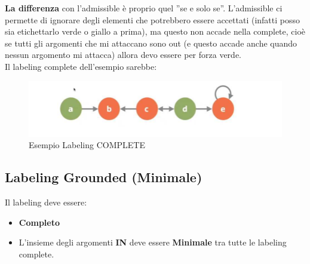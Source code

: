     \noindent \textbf{La differenza} con l'admissible è proprio quel ”se e solo
    se”. L'admissible ci permette di ignorare degli elementi che potrebbero
    essere accettati (infatti posso sia etichettarlo verde o giallo a prima), ma
    questo non accade nella complete, cioè se tutti gli argomenti che mi
    attaccano sono out (e questo accade anche quando nessun argomento mi
    attacca) allora devo essere per forza verde. \\
    Il labeling complete dell'esempio sarebbe:
    \begin{figure}[H]
        \centering
        \includegraphics[width=12cm, keepaspectratio]{img/Cap7/LC2.png}
        \caption{Esempio Labeling COMPLETE}
    \end{figure}

    \subsection{Labeling Grounded (Minimale)}
    Il labeling deve essere:
    \begin{itemize}
        \item \textbf{Completo}
        \item L'insieme degli argomenti \textbf{IN} deve essere
              \textbf{Minimale} tra tutte le labeling complete.
    \end{itemize}
